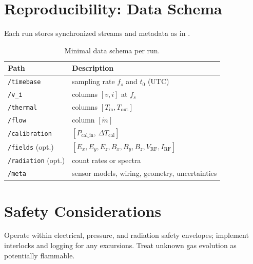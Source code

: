 \documentclass[11pt]{article}
\theoremstyle{remark}
\begin{document}
\section{Reproducibility: Data Schema}
Each run stores synchronized streams and metadata as in .
\begin{table}[h]
\centering
\caption{Minimal data schema per run.}
\label{tab:schema}
\begin{tabular}{ll}
\toprule
Path & Description \\
\midrule
\texttt{/timebase} & sampling rate $f_s$ and $t_0$ (UTC) \\
\texttt{/v\_i} & columns $[v,i]$ at $f_s$ \\
\texttt{/thermal} & columns $[T_{\mathrm{in}},T_{\mathrm{out}}]$ \\
\texttt{/flow} & column $[\dot m]$ \\
\texttt{/calibration} & $[P_{\mathrm{cal\_in}},\,\Delta T_{\mathrm{cal}}]$ \\
\texttt{/fields} (opt.) & $[E_x,E_y,E_z,B_x,B_y,B_z,V_{\mathrm{RF}},I_{\mathrm{RF}}]$ \\
\texttt{/radiation} (opt.) & count rates or spectra \\
\texttt{/meta} & sensor models, wiring, geometry, uncertainties \\
\bottomrule
\end{tabular}
\end{table}

\section{Safety Considerations}
Operate within electrical, pressure, and radiation safety envelopes; implement interlocks and logging for any excursions. Treat unknown gas evolution as potentially flammable.

\appendix
\end{document}
